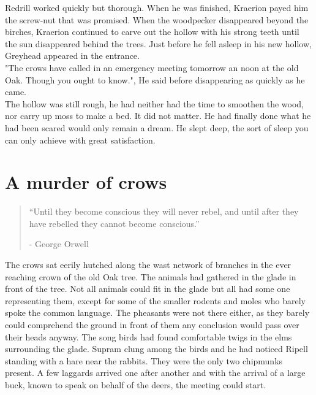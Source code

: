 \documentclass[smalldemyvopaper,11pt,twoside,onecolumn,openright,extrafontsizes]{memoir}
\begin{document}
Redrill worked quickly but thorough. When he was finished, Kraerion payed him the screw-nut that was promised. When the woodpecker disappeared beyond the birches, Kraerion continued to carve out the hollow with his strong teeth until the sun disappeared behind the trees. Just before he fell asleep in his new hollow, Greyhead appeared in the entrance. \\

"The crows have called in an emergency meeting tomorrow an noon at the old Oak. Though you ought to know.", He said before disappearing as quickly as he came.\\

The hollow was still rough, he had neither had the time to smoothen the wood, nor carry up moss to make a bed. It did not matter. He had finally done what he had been scared would only remain a dream. He slept deep, the sort of sleep you can only achieve with great satisfaction.  

\chapter{A murder of crows}

\vspace{-1.3cm}
\begin{localsize}{10}
	\begin{quote}
		 “Until they become conscious they will never rebel, and until after they have rebelled they cannot become conscious.” 
		\begin{flushright}- George Orwell \end{flushright}
	\end{quote} 
\end{localsize}
\vspace{1cm}

The crows sat eerily hutched along the wast network of branches in the ever reaching crown of the old Oak tree. The animals had gathered in the glade in front of the tree. Not all animals could fit in the glade but all had some one representing them, except for some of the smaller rodents and moles who barely spoke the common language. The pheasants were not there either, as they barely could comprehend the ground in front of them any conclusion would pass over their heads anyway. The song birds had found comfortable twigs in the elms surrounding the glade. Supram clung among the birds and he had noticed Ripell standing with a hare near the rabbits. They were the only two chipmunks present. A few laggards arrived one after another and with the arrival of a large buck, known to speak on behalf of the deers, the meeting could start. \\
\end{document}
